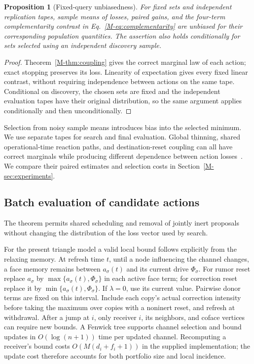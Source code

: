 \documentclass[preprint,11pt,sort&compress]{elsarticle}
\newtheorem{proposition}[theorem]{Proposition}
\begin{document}
\begin{proposition}[Fixed-query unbiasedness]
\label{prop:unbiased}
For fixed sets and independent replication tapes, sample means of losses, paired gains, and the four-term complementarity contrast in Eq.~\ref{M-eq:complementarity} are unbiased for their corresponding population quantities. The assertion also holds conditionally for sets selected using an independent discovery sample.
\end{proposition}
\begin{proof}
Theorem~\ref{M-thm:coupling} gives the correct marginal law of each action; exact stopping preserves its loss. Linearity of expectation gives every fixed linear contrast, without requiring independence between actions on the same tape. Conditional on discovery, the chosen sets are fixed and the independent evaluation tapes have their original distribution, so the same argument applies conditionally and then unconditionally.
\end{proof}

Selection from noisy sample means introduces bias into the selected minimum. We use separate tapes for search and final evaluation. Global thinning, shared operational-time reaction paths, and destination-reset coupling can all have correct marginals while producing different dependence between action losses~\cite{anderson2007,anderson2012}. We compare their paired estimates and selection costs in Section~\ref{M-sec:experiments}.

\subsection{Batch evaluation of candidate actions}

The theorem permits shared scheduling and removal of jointly inert proposals without changing the distribution of the loss vector used by search.

For the present triangle model a valid local bound follows explicitly from the relaxing memory. At refresh time $t$, until a node influencing the channel changes, a face memory remains between $a_\sigma(t)$ and its current drive $\Phi_\sigma$. For rumor reset replace $a_\sigma$ by $\max\{a_\sigma(t),\Phi_\sigma\}$ in each active face term; for correction reset replace it by $\min\{a_\sigma(t),\Phi_\sigma\}$. If $\lambda=0$, use its current value. Pairwise donor terms are fixed on this interval. Include each copy's actual correction intensity before taking the maximum over copies with a noninert reset, and refresh at withdrawal. After a jump at $i$, only receiver $i$, its neighbors, and coface vertices can require new bounds. A Fenwick tree supports channel selection and bound updates in $O(\log(n+1))$ time per updated channel. Recomputing a receiver's bound costs $O(M(d_i+f_i+1))$ in the supplied implementation; the update cost therefore accounts for both portfolio size and local incidence.
\end{document}
